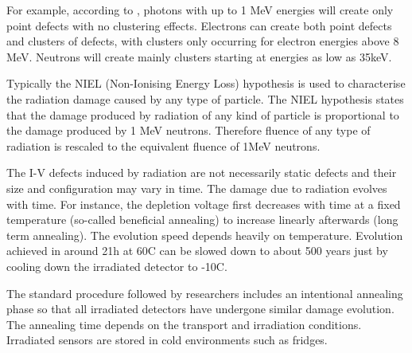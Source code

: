 For example, according to \cite{MMoll}, photons with up to 1 MeV energies will create only point defects with no clustering effects. Electrons can create both point defects and clusters of defects, with clusters only occurring for electron energies above 8 MeV. Neutrons will create mainly clusters starting at energies as low as 35keV. 

Typically the NIEL (Non-Ionising Energy Loss) hypothesis is used to characterise the radiation damage caused by any type of particle. The NIEL hypothesis states that the damage produced by radiation of any kind of particle is proportional to the damage produced by 1 MeV neutrons. Therefore fluence of any type of radiation is rescaled to the equivalent fluence of 1MeV neutrons. %

The I-V defects induced by radiation are not necessarily static defects and their size and configuration may vary in time. The damage due to radiation evolves with time. For instance, the depletion voltage first decreases with time at a fixed temperature (so-called beneficial annealing) to increase linearly afterwards (long term annealing). The evolution speed depends heavily on temperature. Evolution achieved in around 21h at 60C can be slowed down to about 500 years just by cooling down the irradiated detector to -10C. 

The standard procedure followed by researchers includes an intentional annealing phase so that all irradiated detectors have undergone similar damage evolution. The annealing time depends on the transport and irradiation conditions. Irradiated sensors are stored in cold environments such as fridges.


